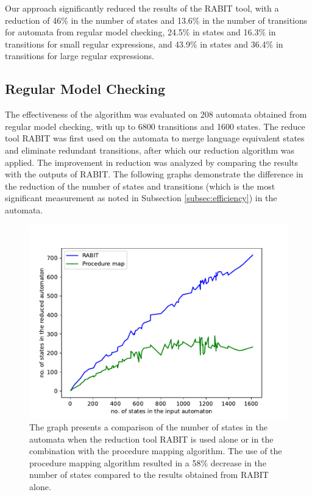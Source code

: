     Our approach significantly reduced the results of the RABIT tool, with a reduction of 46\% in the number of states and 13.6\% in the number of transitions for automata from regular model checking, 24.5\% in states and 16.3\% in transitions for small regular expressions, and 43.9\% in states and 36.4\% in transitions for large regular expressions.

    \subsection{Regular Model Checking}
        The effectiveness of the algorithm was evaluated on 208 automata obtained from regular model checking, with up to 6800 transitions and 1600 states. The reduce tool RABIT was first used on the automata to merge language equivalent states and eliminate redundant transitions, after which our reduction algorithm was applied. The improvement in reduction was analyzed by comparing the results with the outputs of RABIT. The following graphs demonstrate the difference in the reduction of the number of states and transitions (which is the most significant measurement as noted in Subsection \ref{subsec:efficiency}) in the automata.

        \begin{figure}[!h]
            \centering
            \captionsetup{justification=justified}
            \includegraphics[width=1\linewidth]{images/armc-states.pdf}
            \caption{The graph presents a comparison of the number of states in the automata when the reduction tool RABIT is used alone or in the combination with the procedure mapping algorithm. The use of the procedure mapping algorithm resulted in a 58\% decrease in the number of states compared to the results obtained from RABIT alone.}
        \end{figure}

